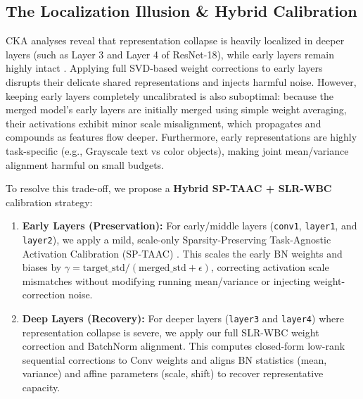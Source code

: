 \documentclass{article}
\theoremstyle{plain}
\theoremstyle{definition}
\theoremstyle{remark}
\begin{document}
\subsection{The Localization Illusion \& Hybrid Calibration}
CKA analyses reveal that representation collapse is heavily localized in deeper layers (such as Layer 3 and Layer 4 of ResNet-18), while early layers remain highly intact \cite{mu2024representation}. Applying full SVD-based weight corrections to early layers disrupts their delicate shared representations and injects harmful noise. However, keeping early layers completely uncalibrated is also suboptimal: because the merged model's early layers are initially merged using simple weight averaging, their activations exhibit minor scale misalignment, which propagates and compounds as features flow deeper. Furthermore, early representations are highly task-specific (e.g., Grayscale text vs color objects), making joint mean/variance alignment harmful on small budgets.

To resolve this trade-off, we propose a \textbf{Hybrid SP-TAAC + SLR-WBC} calibration strategy:
\begin{enumerate}
    \item \textbf{Early Layers (Preservation):} For early/middle layers (\texttt{conv1}, \texttt{layer1}, and \texttt{layer2}), we apply a mild, scale-only Sparsity-Preserving Task-Agnostic Activation Calibration (SP-TAAC) \cite{taac2023}. This scales the early BN weights and biases by $\gamma = \text{target\_std} / (\text{merged\_std} + \epsilon)$, correcting activation scale mismatches without modifying running mean/variance or injecting weight-correction noise.
    \item \textbf{Deep Layers (Recovery):} For deeper layers (\texttt{layer3} and \texttt{layer4}) where representation collapse is severe, we apply our full SLR-WBC weight correction and BatchNorm alignment. This computes closed-form low-rank sequential corrections to Conv weights and aligns BN statistics (mean, variance) and affine parameters (scale, shift) to recover representative capacity.
\end{enumerate}
\end{document}
